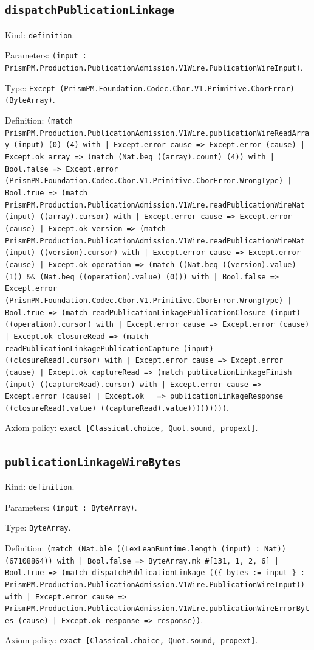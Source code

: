 \documentclass[11pt]{article}
\begin{document}
\subsection*{\texttt{dispatchPublicationLinkage}}
\noindent Kind: \texttt{definition}.\par
\noindent Parameters: \texttt{(input : PrismPM.Production.PublicationAdmission.V1Wire.PublicationWireInput)}.\par
\noindent Type: \texttt{Except (PrismPM.Foundation.Codec.Cbor.V1.Primitive.CborError) (ByteArray)}.\par
\noindent Definition: \texttt{(match PrismPM.Production.PublicationAdmission.V1Wire.publicationWireReadArray (input) (0) (4) with | Except.error cause => Except.error (cause) | Except.ok array => (match (Nat.beq ((array).count) (4)) with | Bool.false => Except.error (PrismPM.Foundation.Codec.Cbor.V1.Primitive.CborError.WrongType) | Bool.true => (match PrismPM.Production.PublicationAdmission.V1Wire.readPublicationWireNat (input) ((array).cursor) with | Except.error cause => Except.error (cause) | Except.ok version => (match PrismPM.Production.PublicationAdmission.V1Wire.readPublicationWireNat (input) ((version).cursor) with | Except.error cause => Except.error (cause) | Except.ok operation => (match ((Nat.beq ((version).value) (1)) \&\& (Nat.beq ((operation).value) (0))) with | Bool.false => Except.error (PrismPM.Foundation.Codec.Cbor.V1.Primitive.CborError.WrongType) | Bool.true => (match readPublicationLinkagePublicationClosure (input) ((operation).cursor) with | Except.error cause => Except.error (cause) | Except.ok closureRead => (match readPublicationLinkagePublicationCapture (input) ((closureRead).cursor) with | Except.error cause => Except.error (cause) | Except.ok captureRead => (match publicationLinkageFinish (input) ((captureRead).cursor) with | Except.error cause => Except.error (cause) | Except.ok \_ => publicationLinkageResponse ((closureRead).value) ((captureRead).value)))))))))}.\par
\noindent Axiom policy: \texttt{exact [Classical.choice, Quot.sound, propext]}.\par
\subsection*{\texttt{publicationLinkageWireBytes}}
\noindent Kind: \texttt{definition}.\par
\noindent Parameters: \texttt{(input : ByteArray)}.\par
\noindent Type: \texttt{ByteArray}.\par
\noindent Definition: \texttt{(match (Nat.ble ((LexLeanRuntime.length (input) : Nat)) (67108864)) with | Bool.false => ByteArray.mk \#[131, 1, 2, 6] | Bool.true => (match dispatchPublicationLinkage ((\{ bytes := input \} : PrismPM.Production.PublicationAdmission.V1Wire.PublicationWireInput)) with | Except.error cause => PrismPM.Production.PublicationAdmission.V1Wire.publicationWireErrorBytes (cause) | Except.ok response => response))}.\par
\noindent Axiom policy: \texttt{exact [Classical.choice, Quot.sound, propext]}.\par
\end{document}
